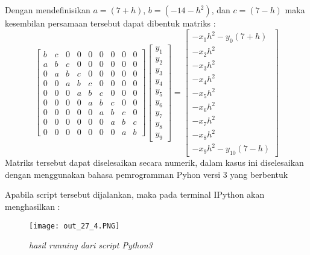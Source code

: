 \documentclass[a4paper,12pt]{article}
\numberwithin{equation}{section} %
\begin{document}
Dengan mendefinisikan $a = (7+h)$, $b = (-14-h^2)$, dan $c = (7-h)$ maka kesembilan persamaan tersebut dapat dibentuk matriks :
\begin{equation}
\begin{bmatrix}
b & c & 0 & 0 & 0 & 0 & 0 & 0 & 0 \\ 
a & b & c & 0 & 0 & 0 & 0 & 0 & 0 \\
0 & a & b & c & 0 & 0 & 0 & 0 & 0 \\ 
0 & 0 & a & b & c & 0 & 0 & 0 & 0 \\
0 & 0 & 0 & a & b & c & 0 & 0 & 0 \\ 
0 & 0 & 0 & 0 & a & b & c & 0 & 0 \\
0 & 0 & 0 & 0 & 0 & a & b & c & 0 \\ 
0 & 0 & 0 & 0 & 0 & 0 & a & b & c \\
0 & 0 & 0 & 0 & 0 & 0 & 0 & a & b 
\end{bmatrix}
\begin{bmatrix}
y_1\\ y_2\\ y_3\\ y_4\\ y_5\\ y_6\\ y_7\\ y_8\\ y_9
\end{bmatrix}
=
\begin{bmatrix}
-x_1h^2 - y_0(7+h) \\ -x_2h^2 \\ -x_3h^2 \\ -x_4h^2 \\ -x_5h^2 \\ -x_6h^2 \\ -x_7h^2 \\ -x_8h^2 \\ -x_9h^2 - y_{10}(7-h)
\end{bmatrix}
\end{equation}
Matriks tersebut dapat diselesaikan secara numerik, dalam kasus ini diselesaikan dengan menggunakan bahasa pemrogramman Pyhon versi 3 yang berbentuk


Apabila script tersebut dijalankan, maka pada terminal IPython akan menghasilkan :
\begin{figure}[h]
	\centering
	\caption{\textit{hasil running dari script Python3}}
	\texttt{[image: out\_27\_4.PNG]}
\end{figure}
\end{document}
